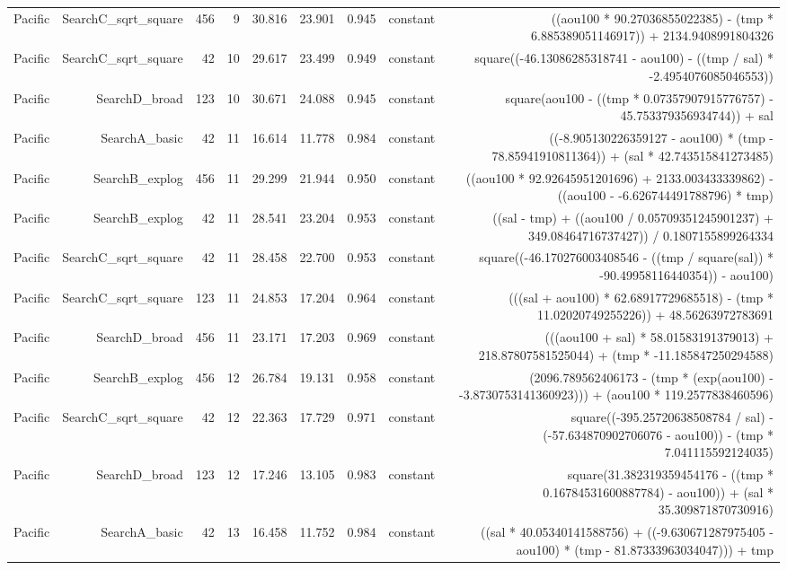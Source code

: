 \begin{table}
{\begin{tabular}{lrrrrrrrr}
Pacific & SearchC\_sqrt\_square & 456 & 9 & 30.816 & 23.901 & 0.945 & constant & ((aou100 * 90.27036855022385) - (tmp * 6.885389051146917)) + 2134.9408991804326 \\
Pacific & SearchC\_sqrt\_square & 42 & 10 & 29.617 & 23.499 & 0.949 & constant & square((-46.13086285318741 - aou100) - ((tmp / sal) * -2.4954076085046553)) \\
Pacific & SearchD\_broad & 123 & 10 & 30.671 & 24.088 & 0.945 & constant & square(aou100 - ((tmp * 0.07357907915776757) - 45.753379356934744)) + sal \\
Pacific & SearchA\_basic & 42 & 11 & 16.614 & 11.778 & 0.984 & constant & ((-8.905130226359127 - aou100) * (tmp - 78.85941910811364)) + (sal * 42.743515841273485) \\
Pacific & SearchB\_explog & 456 & 11 & 29.299 & 21.944 & 0.950 & constant & ((aou100 * 92.92645951201696) + 2133.003433339862) - ((aou100 - -6.626744491788796) * tmp) \\
Pacific & SearchB\_explog & 42 & 11 & 28.541 & 23.204 & 0.953 & constant & ((sal - tmp) + ((aou100 / 0.05709351245901237) + 349.08464716737427)) / 0.1807155899264334 \\
Pacific & SearchC\_sqrt\_square & 42 & 11 & 28.458 & 22.700 & 0.953 & constant & square((-46.170276003408546 - ((tmp / square(sal)) * -90.49958116440354)) - aou100) \\
Pacific & SearchC\_sqrt\_square & 123 & 11 & 24.853 & 17.204 & 0.964 & constant & (((sal + aou100) * 62.68917729685518) - (tmp * 11.02020749255226)) + 48.56263972783691 \\
Pacific & SearchD\_broad & 456 & 11 & 23.171 & 17.203 & 0.969 & constant & (((aou100 + sal) * 58.01583191379013) + 218.87807581525044) + (tmp * -11.185847250294588) \\
Pacific & SearchB\_explog & 456 & 12 & 26.784 & 19.131 & 0.958 & constant & (2096.789562406173 - (tmp * (exp(aou100) - -3.8730753141360923))) + (aou100 * 119.2577838460596) \\
Pacific & SearchC\_sqrt\_square & 42 & 12 & 22.363 & 17.729 & 0.971 & constant & square((-395.25720638508784 / sal) - (-57.634870902706076 - aou100)) - (tmp * 7.041115592124035) \\
Pacific & SearchD\_broad & 123 & 12 & 17.246 & 13.105 & 0.983 & constant & square(31.382319359454176 - ((tmp * 0.16784531600887784) - aou100)) + (sal * 35.309871870730916) \\
Pacific & SearchA\_basic & 42 & 13 & 16.458 & 11.752 & 0.984 & constant & ((sal * 40.05340141588756) + ((-9.630671287975405 - aou100) * (tmp - 81.87333963034047))) + tmp \\

\end{tabular}}
\end{table}
